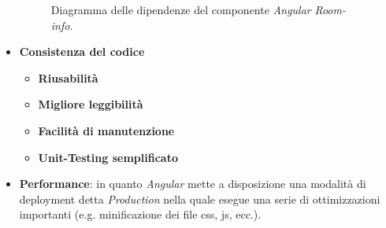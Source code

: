 \begin{itemize}
\begin{figure}
        \caption{Diagramma delle dipendenze del componente \textit{Angular} \textit{Room-info}.}
        \label{fig:angular-room-info-component-dependencies-diagram}
    \end{figure}
    \newpage
    \item \textbf{Consistenza del codice} 
        \begin{itemize}
         \item \textbf{Riusabilità}
         \item \textbf{Migliore leggibilità}
         \item \textbf{Facilità di manutenzione}
         \item \textbf{Unit-Testing semplificato}
        \end{itemize}
    \item \textbf{Performance}: in quanto \textit{Angular} mette a disposizione una modalità di deployment detta \textit{Production} nella quale esegue una serie di ottimizzazioni importanti (e.g. minificazione dei file css, js, ecc.).
\end{itemize}
